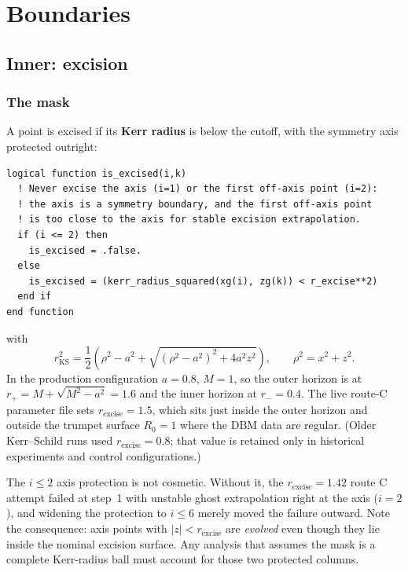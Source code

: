 \documentclass[11pt,openany]{book}
\begin{document}
\chapter{Boundaries}
\label{ch:bcs}

\section{Inner: excision}

\subsection{The mask}

A point is excised if its \textbf{Kerr radius} is below the cutoff, with the
symmetry axis protected outright:
\begin{lstlisting}
logical function is_excised(i,k)
  ! Never excise the axis (i=1) or the first off-axis point (i=2):
  ! the axis is a symmetry boundary, and the first off-axis point
  ! is too close to the axis for stable excision extrapolation.
  if (i <= 2) then
    is_excised = .false.
  else
    is_excised = (kerr_radius_squared(xg(i), zg(k)) < r_excise**2)
  end if
end function
\end{lstlisting}
with
\begin{equation}
r^2_{\mathrm{KS}} = \frac{1}{2}\left(\rho^2 - a^2
  + \sqrt{(\rho^2-a^2)^2 + 4a^2z^2}\right),
\qquad \rho^2 = x^2 + z^2 .
\end{equation}
In the production configuration $a = 0.8$, $M = 1$, so the outer horizon is
at $r_+ = M + \sqrt{M^2 - a^2} = 1.6$ and the inner horizon at $r_- = 0.4$.
The live route-C parameter file sets $r_{\mathrm{excise}} = 1.5$, which sits
just inside the outer horizon and outside the trumpet surface $R_0 = 1$ where
the DBM data are regular. (Older Kerr--Schild runs used
$r_{\mathrm{excise}} = 0.8$; that value is retained only in historical
experiments and control configurations.)

\gotcha
The $i \leq 2$ axis protection is not cosmetic. Without it, the
$r_{\mathrm{excise}} = 1.42$ route C attempt failed at step~1 with unstable
ghost extrapolation right at the axis ($i = 2$), and widening the protection
to $i \leq 6$ merely moved the failure outward. Note the consequence: axis
points with $|z| < r_{\mathrm{excise}}$ are \emph{evolved} even though they
lie inside the nominal excision surface. Any analysis that assumes the mask
is a complete Kerr-radius ball must account for those two protected columns.
\end{document}
